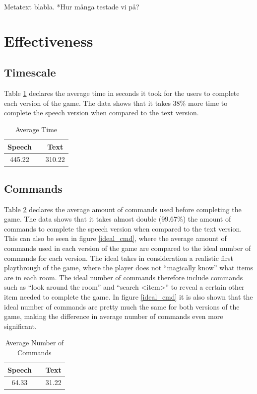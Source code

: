Metatext blabla.
*Hur många testade vi på?

\section{Effectiveness}

\subsection{Timescale} %
Table \ref{avg_time} declares the average time in seconds it took for the users to complete each version of the game. The data shows that it takes 38\% more time to complete the speech version when compared to the text version.

\begin{table}[h!]
  \centering
  \begin{tabular}{ccc}
    \toprule
    Speech &   & Text\\
    \midrule
    445.22 &   & 310.22\\
    \bottomrule
  \end{tabular}
  \caption{Average Time}\label{avg_time}
\end{table}

\subsection{Commands} %
Table \ref{avg_cmd} declares the average amount of commands used before completing the game. The data shows that it takes almost double (99.67\%) the amount of commands to complete the speech version when compared to the text version. This can also be seen in figure \ref{ideal_cmd}, where the average amount of commands used in each version of the game are compared to the ideal number of commands for each version. The ideal takes in consideration a realistic first playthrough of the game, where the player does not ``magically know'' what items are in each room. The ideal number of commands therefore include commands such as ``look around the room'' and ``search <item>'' to reveal a certain other item needed to complete the game. In figure \ref{ideal_cmd} it is also shown that the ideal number of commands are pretty much the same for both versions of the game, making the difference in average number of commands even more significant.

\begin{table}[h!]
  \centering
  \begin{tabular}{ccc}
    \toprule
    Speech &   & Text\\
    \midrule
    64.33 &   & 31.22\\
    \bottomrule
  \end{tabular}
  \caption{Average Number of Commands}\label{avg_cmd} %
\end{table}

